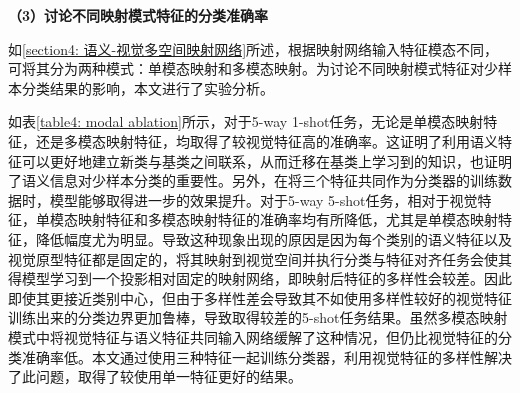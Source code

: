 \textbf{（3）讨论不同映射模式特征的分类准确率}

如\ref{section4: 语义-视觉多空间映射网络}所述，根据映射网络输入特征模态不同，可将其分为两种模式：单模态映射和多模态映射。为讨论不同映射模式特征对少样本分类结果的影响，本文进行了实验分析。

如表\ref{table4: modal ablation}所示，对于5-way 1-shot任务，无论是单模态映射特征，还是多模态映射特征，均取得了较视觉特征高的准确率。这证明了利用语义特征可以更好地建立新类与基类之间联系，从而迁移在基类上学习到的知识，也证明了语义信息对少样本分类的重要性。另外，在将三个特征共同作为分类器的训练数据时，模型能够取得进一步的效果提升。对于5-way 5-shot任务，相对于视觉特征，单模态映射特征和多模态映射特征的准确率均有所降低，尤其是单模态映射特征，降低幅度尤为明显。导致这种现象出现的原因是因为每个类别的语义特征以及视觉原型特征都是固定的，将其映射到视觉空间并执行分类与特征对齐任务会使其得模型学习到一个投影相对固定的映射网络，即映射后特征的多样性会较差。因此即使其更接近类别中心，但由于多样性差会导致其不如使用多样性较好的视觉特征训练出来的分类边界更加鲁棒，导致取得较差的5-shot任务结果。虽然多模态映射模式中将视觉特征与语义特征共同输入网络缓解了这种情况，但仍比视觉特征的分类准确率低。本文通过使用三种特征一起训练分类器，利用视觉特征的多样性解决了此问题，取得了较使用单一特征更好的结果。


